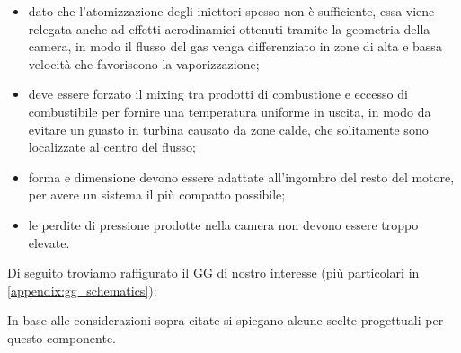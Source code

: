 \begin{itemize}[wide,itemsep=3pt,topsep=3pt]

\item
dato che l'atomizzazione degli iniettori spesso non è sufficiente, essa viene relegata anche ad effetti aerodinamici ottenuti tramite la geometria della camera, in modo il flusso del gas venga differenziato in zone di alta e bassa velocità che favoriscono la vaporizzazione;

\item
deve essere forzato il mixing tra prodotti di combustione e eccesso di combustibile per fornire una temperatura uniforme in uscita, in modo da evitare un guasto in turbina causato da zone calde, che solitamente sono localizzate al centro del flusso;

\item
forma e dimensione devono essere adattate all'ingombro del resto del motore, per avere un sistema il più compatto possibile;

\item
le perdite di pressione prodotte nella camera non devono essere troppo elevate.

\end{itemize}

Di seguito troviamo raffigurato il GG di nostro interesse (più particolari in \autoref{appendix:gg_schematics}):



In base alle considerazioni sopra citate si spiegano alcune scelte progettuali per questo componente.

